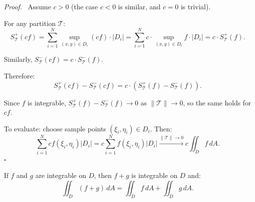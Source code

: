 \documentclass[11pt]{report}
\renewenvironment{proof}[1][Proof]{\par\noindent\textit{#1.}\ }{\hfill$\square$\par\medskip}
\begin{document}
\begin{proof}
Assume $c > 0$ (the case $c < 0$ is similar, and $c = 0$ is trivial).

For any partition $\mathcal{T}$:
\[
S_{\mathcal{T}}^+(cf) = \sum_{i=1}^{N} \sup_{(x,y) \in D_i} (cf) \cdot |D_i| = \sum_{i=1}^{N} c \cdot \sup_{(x,y) \in D_i} f \cdot |D_i| = c \cdot S_{\mathcal{T}}^+(f).
\]

Similarly, $S_{\mathcal{T}}^-(cf) = c \cdot S_{\mathcal{T}}^-(f)$.

Therefore:
\[
S_{\mathcal{T}}^+(cf) - S_{\mathcal{T}}^-(cf) = c \cdot \left( S_{\mathcal{T}}^+(f) - S_{\mathcal{T}}^-(f) \right).
\]

Since $f$ is integrable, $S_{\mathcal{T}}^+(f) - S_{\mathcal{T}}^-(f) \to 0$ as $\|\mathcal{T}\| \to 0$, so the same holds for $cf$.

To evaluate: choose sample points $(\xi_i, \eta_i) \in D_i$. Then:
\[
\sum_{i=1}^{N} cf(\xi_i, \eta_i) |D_i| = c \sum_{i=1}^{N} f(\xi_i, \eta_i) |D_i| \xrightarrow{\|\mathcal{T}\| \to 0} c \iint_D f \, dA.
\]
\end{proof}

\begin{theorem}
If $f$ and $g$ are integrable on $D$, then $f + g$ is integrable on $D$ and:
\[
\iint_D (f + g) \, dA = \iint_D f \, dA + \iint_D g \, dA.
\]
\end{theorem}
\end{document}
